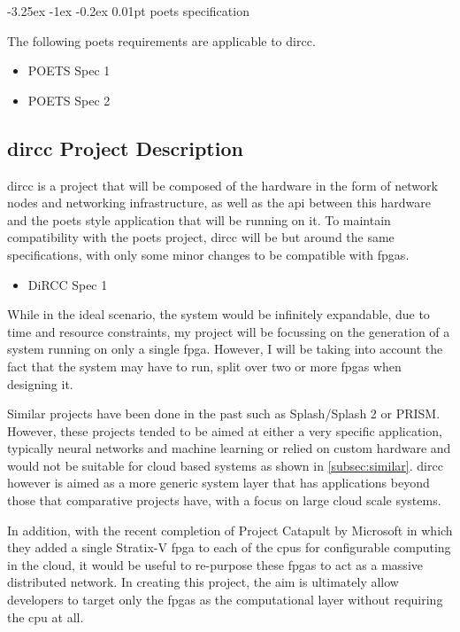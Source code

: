 \documentclass[paper=a4, fontsize=11pt, bibliography=totocnumbered]{scrartcl}
\makeatletter
\renewcommand\paragraph{\@startsection{paragraph}{4}{\z@}%
  {-3.25ex \@plus -1ex \@minus -0.2ex}%
  {0.01pt}%
  {\raggedsection\normalfont\sectfont\nobreak\size@paragraph}%
}
\numberwithin{equation}{section}		%
\numberwithin{figure}{section}			%
\numberwithin{table}{section}				%
\makeatother
\begin{document}
\paragraph{\Gls{poets} specification}

The following \gls{poets} requirements are applicable to \gls{dircc}.
\begin{itemize}
\item POETS Spec 1
\item POETS Spec 2
\end{itemize}

\subsection{\Gls{dircc} Project Description}

\Gls{dircc} is a project that will be composed of the hardware in the form of \glspl{network node} and networking infrastructure, as well as the \gls{api} between this hardware and the \gls{poets} style application that will be running on it. To maintain compatibility with the \gls{poets} project, \gls{dircc} will be but around the same specifications, with only some minor changes to be compatible with \glspl{fpga}.

\begin{itemize}
\item DiRCC Spec 1
\end{itemize}

While in the ideal scenario, the system would be infinitely expandable, due to time and resource constraints, my project will be focussing on the generation of a system running on only a single \gls{fpga}. However, I will be taking into account the fact that the system may have to run, split over two or more \glspl{fpga} when designing it.

Similar projects have been done in the past such as Splash/Splash 2\cite{pub:1_arnold_buell_hoang_pryor_shirazi_thistle} or PRISM\cite{pub:agarwal1994asynchronous}. However, these projects tended to be aimed at either a very specific application, typically neural networks and machine learning or relied on custom hardware and would not be suitable for cloud based systems as shown in \cref{subsec:similar}. \Gls{dircc} however is aimed as a more generic system layer that has applications beyond those that comparative projects have, with a focus on large cloud scale systems.

In addition, with the recent completion of Project Catapult by Microsoft \cite{pub:configurable-cloud-acceleration} in which they added a single Stratix-V \gls{fpga} to each of the \glspl{cpu} for configurable computing in the cloud, it would be useful to re-purpose these \glspl{fpga} to act as a massive distributed network. In creating this project, the aim is ultimately allow developers to target only the \glspl{fpga} as the computational layer without requiring the \gls{cpu} at all.
\end{document}
